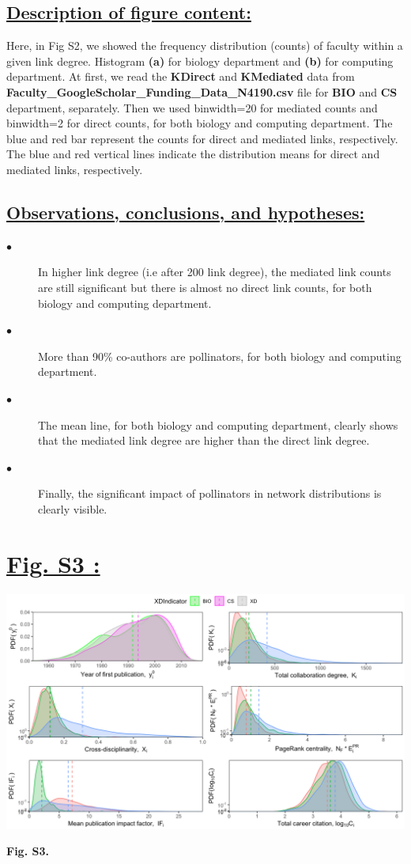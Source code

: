 \documentclass{article}\usepackage[]{graphicx}\usepackage[]{color}
\begin{document}
\subsection*{\underline{Description of figure content:}}
\par{Here, in Fig S2, we showed the frequency distribution (counts) of faculty within a given link degree. Histogram \textbf{(a)} for biology department and \textbf{(b)} for computing department. At first, we read the \textbf{KDirect} and \textbf{KMediated} data from \textbf{Faculty\_GoogleScholar\_Funding\_Data\_N4190.csv} file for \textbf{BIO} and \textbf{CS} department, separately. Then we used binwidth=20 for mediated counts and binwidth=2 for direct counts, for both biology and computing department. The blue and red bar represent the counts for direct and mediated links, respectively. The blue and red vertical lines indicate the distribution means for direct and mediated links, respectively.}
\subsection*{\underline{Observations, conclusions, and hypotheses:}}
\begin{description}
  \item[$\bullet$] In higher link degree (i.e after 200 link degree), the mediated link counts are still significant but there is almost no direct link counts, for both biology and computing department. 
  \item[$\bullet$] More than 90\% co-authors are pollinators, for both biology and computing department. 
  \item[$\bullet$] The mean line, for both biology and computing department, clearly shows that the mediated link degree are higher than the direct link degree. 
  \item[$\bullet$] Finally, the significant impact of pollinators in network distributions is clearly visible.
\end{description}

\newpage
\section*{\underline{Fig. S3 :}}
\begin{center}
\includegraphics[scale=0.4]{3_ggplot.png}
\newline
\par{\textbf{Fig. S3.}}
\end{center}
\end{document}
